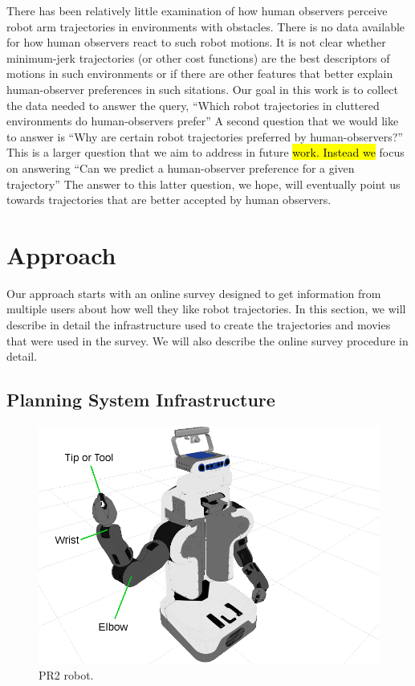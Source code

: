 \documentclass[letterpaper, 10 pt, conference]{ieeeconf}  %
\begin{document}
There has been relatively little examination of how human observers perceive robot arm trajectories in environments with obstacles. There is no data available for how human observers react to such robot motions. It is not clear whether minimum-jerk trajectories (or other cost functions) are the best descriptors of motions in such environments or if there are other features that better explain human-observer preferences in such sitations. Our goal in this work is to collect the data needed to answer the query, ``Which robot trajectories in cluttered environments do human-observers prefer'' A second question that we would like to answer is ``Why are certain robot trajectories preferred by human-observers?'' This is a larger question that we aim to address in future \hl{work. Instead we} focus on answering ``Can we predict a human-observer preference for a given trajectory'' The answer to this latter question, we hope, will eventually point us towards trajectories that are better accepted by human observers. 

\section{Approach}
\label{sec:survey}
Our approach starts with an online survey designed to get information from multiple users about how well they like robot trajectories. In this section, we will describe in detail the infrastructure used to create the trajectories and movies that were used in the survey. We will also describe the online survey procedure in detail. 

\subsection{Planning System Infrastructure}

\begin{figure}
\centering
  \includegraphics[trim = 0mm 0mm 40mm 0mm, width=0.5\columnwidth, clip=true]{pictures/pr2_robot_4_downscale}
\caption{{\footnotesize PR2 robot.}}
\label{fig:PR2}
\vspace{0.1in}
\end{figure}
\end{document}

